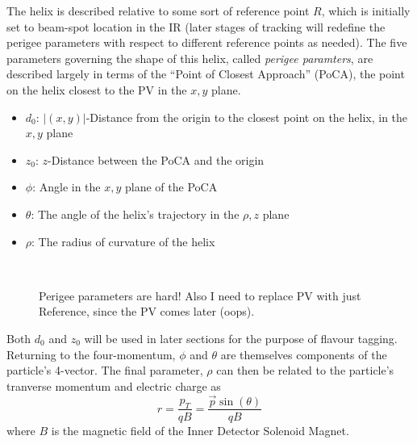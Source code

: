             The helix is described relative to some sort of reference point $R$,
                which is initially set to beam-spot location in the IR
                (later stages of tracking will redefine the perigee parameters with respect to different reference points as needed).
            The five parameters governing the shape of this helix, called \textit{perigee paramters}, 
                are described largely in terms of the ``Point of Closest Approach'' (PoCA),
                the point on the helix closest to the PV in the $x,y$ plane.
            \begin{itemize}
                \item $d_0$: $|(x,y)|$-Distance from the origin to the closest point on the helix, in the $x,y$ plane
                \item $z_0$: $z$-Distance between the PoCA and the origin
                \item $\phi$: Angle in the $x,y$ plane of the PoCA
                \item $\theta$: The angle of the helix's trajectory in the $\rho,z$ plane
                \item $\rho$: The radius of curvature of the helix
            \end{itemize}

            \begin{figure}
                \\
                \caption{
                    Perigee parameters are hard! Also I need to replace PV with just Reference, since the PV comes later (oops).
                }
                \label{fig:perigee_params}
            \end{figure}
            

            Both $d_0$ and $z_0$ will be used in later sections for the purpose of flavour tagging.
            Returning to the four-momentum, $\phi$ and $\theta$ are themselves components of the particle's 4-vector.
            The final parameter, $\rho$ can then be related to the particle's tranverse momentum and electric charge as
            \begin{equation}
            r = \frac{p_T}{qB} = \frac{\vec{p} \sin(\theta)}{qB}
            \end{equation}
            where $B$ is the magnetic field of the Inner Detector Solenoid Magnet.
            \cite{thesis_track_sim_and_reco}

